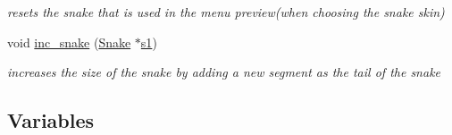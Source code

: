 \begin{DoxyCompactItemize}
\begin{DoxyCompactList}\small\item\em resets the snake that is used in the menu preview(when choosing the snake skin) \end{DoxyCompactList}\item 
void \hyperlink{group__snake_ga155db98fd681adcf82c1d07b8c4372f8}{inc\+\_\+snake} (\hyperlink{structSnake}{Snake} $\ast$\hyperlink{group__man__events_gaf79c0d77b0cca9ebf96bbbed1f88aed0}{s1})
\begin{DoxyCompactList}\small\item\em increases the size of the snake by adding a new segment as the tail of the snake \end{DoxyCompactList}\end{DoxyCompactItemize}
\subsection*{Variables}
